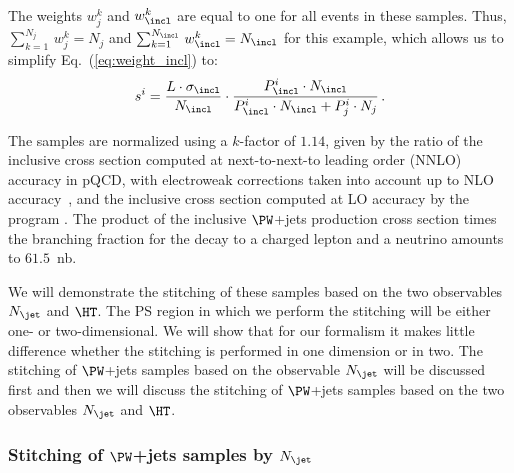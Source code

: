The weights $w_{j}^{k}$ and $w_{\incl}^{k}$ are equal to one for all events in these samples.
Thus, $\sum_{k=1}^{N_{j}} \, w_{j}^{k} = N_{j}$ and $\sum_{k=1}^{N_{\incl}} \, w_{\incl}^{k} = N_{\incl}$ for this example,
which allows us to simplify Eq.~(\ref{eq:weight_incl}) to:
\begin{equation}
s^{i} = \frac{L \cdot \sigma_{\incl}}{N_{\incl}} \cdot \frac{P_{\incl}^{i} \cdot N_{\incl}}{P_{\incl}^{i} \cdot N_{\incl} + P_{j}^{i} \cdot N_{j}} \, .
\label{eq:weight_incl_simplified}
\end{equation}

The samples are normalized using a $k$-factor of $1.14$, given by the ratio of the inclusive cross section computed at next-to-next-to leading order (NNLO) accuracy in pQCD,
with electroweak corrections taken into account up to NLO accuracy~\cite{Li:2012wna},
and the inclusive cross section computed at LO accuracy by the program \MGvATNLO.
The product of the inclusive $\PW$+jets production cross section times the branching fraction for the decay to a charged lepton and a neutrino amounts to $61.5$~nb.

We will demonstrate the stitching of these samples based on the two observables $N_{\jet}$ and $\HT$.
The PS region in which we perform the stitching will be either one- or two-dimensional.
We will show that for our formalism
it makes little difference whether the stitching is performed in one dimension or in two.
The stitching of $\PW$+jets samples based on the observable $N_{\jet}$ will be discussed first
and then we will discuss the stitching of $\PW$+jets samples based on the two observables $N_{\jet}$ and $\HT$.


\subsubsection{Stitching of \texorpdfstring{$\PW$}{W}+jets samples by \texorpdfstring{$N_{\jet}$}{Njet}}
\label{sec:WJets_vs_Njet}

